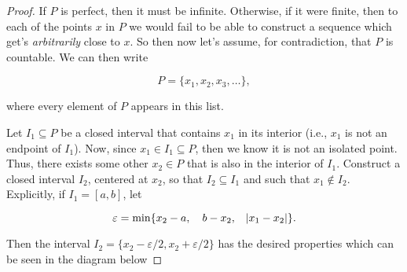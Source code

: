 \documentclass{article}
\theoremstyle{definition}
\theoremstyle{remark}
\theoremstyle{definition}
\begin{document}
\begin{proof}
    If $P$ is perfect, then it must be infinite. Otherwise, if it were finite, then to each of the points $x$ in $P$ we would fail to be able to construct a sequence which get's \textit{arbitrarily} close to $x$. So then now let's assume, for contradiction, that $P$ is countable. We can then write
        
    \begin{equation*}
        P=\{x_1,x_2,x_3,\dots\},
    \end{equation*}
        
    \noindent where every element of $P$ appears in this list. \par 
    Let $I_1\subseteq P$ be a closed interval that contains $x_1$ in its interior (i.e., $x_1$ is not an endpoint of $I_1$). Now, since $x_1\in I_1\subseteq P$, then we know it is not an isolated point. Thus, there exists some other $x_2\in P$ that is also in the interior of $I_1$. Construct a closed interval $I_2$, centered at $x_2$, so that $I_2\subseteq I_1$ and such that $x_1\notin I_2$. Explicitly, if $I_1=[a,b]$, let
        
    \begin{equation*}
        \varepsilon=\min\{x_2-a,\quad b-x_2,\quad\abs{x_1-x_2}\}.
    \end{equation*}
        
    \noindent Then the interval $I_2=\{x_2-\varepsilon/2,x_2+\varepsilon/2\}$ has the desired properties which can be seen in the diagram below
        

\end{proof}
\end{document}
